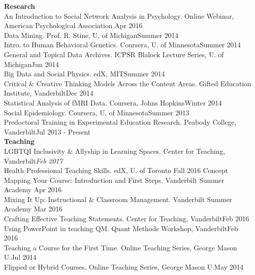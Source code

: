%
{\large \textbf{Research}}\\
An Introduction to Social Network Analysis in Psychology. Online Webinar, American Psychological Association \hfill{Apr 2016}\smallskip\\
Data Mining. Prof. R. Stine, U. of Michigan\hfill{Summer 2014}\smallskip\\
Intro. to Human Behavioral Genetics. Coursera, U. of Minnesota\hfill{Summer 2014}%
\smallskip\\
General and Topical Data Archives. ICPSR Blalock Lecture Series, U. of Michigan\hfill{Jun 2014}\smallskip\\
Big Data and Social Physics. edX, MIT\hfill{Summer 2014}%
\smallskip\\
Critical \& Creative Thinking Models Across the Content Areas. Gifted Education Institute, Vanderbilt\hfill{Dec 2014}\smallskip\\
Statistical Analysis of fMRI Data. Coursera, Johns Hopkins\hfill{Winter 2014}%
\smallskip\\
Social Epidemiology. Coursera, U. of Minnesota\hfill{Summer 2013}%
\smallskip\\
Predoctoral Training in Experimental Education Research. Peabody College, Vanderbilt\hfill{Jul 2013 - Present}\smallskip\\
%
%
{\large {\bf Teaching}}\\
 LGBTQI Inclusivity & Allyship in Learning Spaces.  Center for Teaching, Vanderbilt\hfill{\textit{Feb 2017}}\smallskip\\
Health Professional Teaching Skills. edX, U. of Toronto \hfill{Fall 2016}%
Concept Mapping Your Course: Introduction and First Steps. Vanderbilt Summer Academy \hfill{Apr 2016}\smallskip\\
Mixing It Up: Instructional \& Classroom Management. Vanderbilt Summer Academy \hfill{Mar 2016}\smallskip\\
Crafting Effective Teaching Statements. Center for Teaching, Vanderbilt\hfill{Feb 2016}\smallskip\\
Using PowerPoint in teaching QM. Quant Methods Workshop, Vanderbilt\hfill{Feb 2016}\smallskip\\
Teaching a Course for the First Time. Online Teaching Series, George Mason U.\hfill{Jul 2014}\smallskip\\
Flipped or Hybrid Courses. Online Teaching Series, George Mason U.\hfill{May 2014}\smallskip\\

